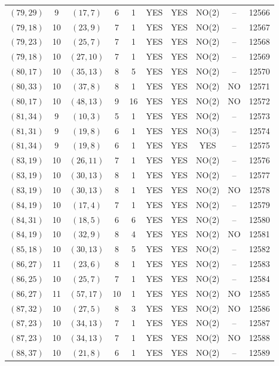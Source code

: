 \begin{longtable}{|c|c|c|c|c|c|c|c|c|c|}
$(79, 29)$ & 9 & $(17, 7)$ & 6 & 1 & YES & YES & NO(2) & -- & 12566\\
$(79, 18)$ & 10 & $(23, 9)$ & 7 & 1 & YES & YES & NO(2) & -- & 12567\\
$(79, 23)$ & 10 & $(25, 7)$ & 7 & 1 & YES & YES & NO(2) & -- & 12568\\
$(79, 18)$ & 10 & $(27, 10)$ & 7 & 1 & YES & YES & NO(2) & -- & 12569\\
$(80, 17)$ & 10 & $(35, 13)$ & 8 & 5 & YES & YES & NO(2) & -- & 12570\\
$(80, 33)$ & 10 & $(37, 8)$ & 8 & 1 & YES & YES & NO(2) & NO & 12571\\
$(80, 17)$ & 10 & $(48, 13)$ & 9 & 16 & YES & YES & NO(2) & NO & 12572\\
$(81, 34)$ & 9 & $(10, 3)$ & 5 & 1 & YES & YES & NO(2) & -- & 12573\\
$(81, 31)$ & 9 & $(19, 8)$ & 6 & 1 & YES & YES & NO(3) & -- & 12574\\
$(81, 34)$ & 9 & $(19, 8)$ & 6 & 1 & YES & YES & YES & -- & 12575\\
$(83, 19)$ & 10 & $(26, 11)$ & 7 & 1 & YES & YES & NO(2) & -- & 12576\\
$(83, 19)$ & 10 & $(30, 13)$ & 8 & 1 & YES & YES & NO(2) & -- & 12577\\
$(83, 19)$ & 10 & $(30, 13)$ & 8 & 1 & YES & YES & NO(2) & NO & 12578\\
$(84, 19)$ & 10 & $(17, 4)$ & 7 & 1 & YES & YES & NO(2) & -- & 12579\\
$(84, 31)$ & 10 & $(18, 5)$ & 6 & 6 & YES & YES & NO(2) & -- & 12580\\
$(84, 19)$ & 10 & $(32, 9)$ & 8 & 4 & YES & YES & NO(2) & NO & 12581\\
$(85, 18)$ & 10 & $(30, 13)$ & 8 & 5 & YES & YES & NO(2) & -- & 12582\\
$(86, 27)$ & 11 & $(23, 6)$ & 8 & 1 & YES & YES & NO(2) & -- & 12583\\
$(86, 25)$ & 10 & $(25, 7)$ & 7 & 1 & YES & YES & NO(2) & -- & 12584\\
$(86, 27)$ & 11 & $(57, 17)$ & 10 & 1 & YES & YES & NO(2) & NO & 12585\\
$(87, 32)$ & 10 & $(27, 5)$ & 8 & 3 & YES & YES & NO(2) & NO & 12586\\
$(87, 23)$ & 10 & $(34, 13)$ & 7 & 1 & YES & YES & NO(2) & -- & 12587\\
$(87, 23)$ & 10 & $(34, 13)$ & 7 & 1 & YES & YES & NO(2) & NO & 12588\\
$(88, 37)$ & 10 & $(21, 8)$ & 6 & 1 & YES & YES & NO(2) & -- & 12589\\

\end{longtable}
